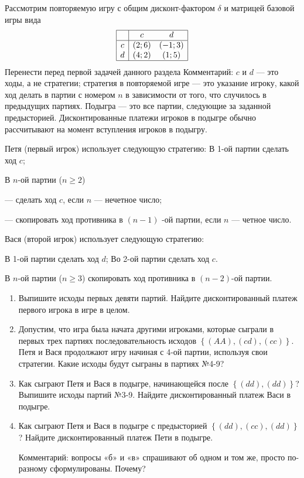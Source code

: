 \begin{problem}

Рассмотрим повторяемую игру с общим дисконт-фактором  $\delta $  и матрицей базовой игры вида
\[\begin{array}{|c|cc|}  \hline {} & {c} & {d} \\  \hline {c} & (2;6) & (-1;3) \\ {d} & (4;2) & (1;5) \\  \hline  \end{array}\]
{\red Перенести перед первой задачей данного раздела} Комментарий:  $c$  и  $d$  — это ходы, а не стратегии; стратегия в повторяемой игре — это указание игроку, какой ход делать в партии с номером  $n$  в зависимости от того, что случилось в предыдущих партиях.
Подыгра — это все партии, следующие за заданной предысторией. Дисконтированные платежи игроков в подыгре обычно рассчитывают на момент вступления игроков в подыгру.\par
Петя (первый игрок) использует следующую стратегию:
В 1-ой партии сделать ход  $c$;\par
В  $n$-ой партии ($n\ge 2$)\par
       — сделать ход  $c$, если  $n$  — нечетное число;\par
       — скопировать ход противника в  $\left(n-1\right)$ -ой партии, если  $n$  — четное число.\par
Вася (второй игрок) использует следующую стратегию:\par
В 1-ой партии сделать ход  $d$; Во 2-ой партии сделать ход  $c$.\par
В  $n$-ой партии ($n\ge 3$) скопировать ход противника в  $\left(n-2\right)$-ой партии.\par
\begin{enumerate}
\item      Выпишите исходы первых девяти партий. Найдите дисконтированный платеж первого игрока в игре в целом.\par
\item      Допустим, что игра была начата другими игроками, которые сыграли в первых трех партиях последовательность исходов  $\left\{\left(AA\right),\left(cd\right),\left(cc\right)\right\}$. Петя и Вася продолжают игру начиная с 4-ой партии, используя свои стратегии. Какие исходы будут сыграны в партиях №4-9?\par
\item       Как сыграют Петя и Вася в подыгре, начинающейся после  $\left\{\left(dd\right),\left(dd\right)\right\}$? Выпишите исходы партий №3-9. Найдите дисконтированный платеж Васи в подыгре.\par
\item      Как сыграют Петя и Вася в подыгре с предысторией  $\left\{\left(dd\right),\left(cc\right),\left(dd\right)\right\}$? Найдите дисконтированный платеж Пети в подыгре.\par
Комментарий: вопросы «б» и «в» спрашивают об одном и том же, просто по-разному сформулированы. {\red Почему?}
\end{enumerate}

\begin{sol}

\end{sol}
\end{problem}

